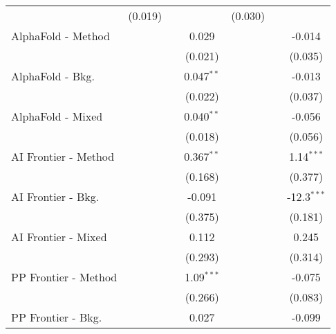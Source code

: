 \begin{tabular}{lcccccc}
                                  & (0.019)        &               &               & (0.030)        &              &   \\   
   AlphaFold - Method             &                &               & 0.029         &                &              & -0.014\\   
                                  &                &               & (0.021)       &                &              & (0.035)\\   
   AlphaFold - Bkg.               &                &               & 0.047$^{**}$  &                &              & -0.013\\   
                                  &                &               & (0.022)       &                &              & (0.037)\\   
   AlphaFold - Mixed              &                &               & 0.040$^{**}$  &                &              & -0.056\\   
                                  &                &               & (0.018)       &                &              & (0.056)\\   
   AI Frontier - Method           &                &               & 0.367$^{**}$  &                &              & 1.14$^{***}$\\   
                                  &                &               & (0.168)       &                &              & (0.377)\\   
   AI Frontier - Bkg.             &                &               & -0.091        &                &              & -12.3$^{***}$\\   
                                  &                &               & (0.375)       &                &              & (0.181)\\   
   AI Frontier - Mixed            &                &               & 0.112         &                &              & 0.245\\   
                                  &                &               & (0.293)       &                &              & (0.314)\\   
   PP Frontier - Method           &                &               & 1.09$^{***}$  &                &              & -0.075\\   
                                  &                &               & (0.266)       &                &              & (0.083)\\   
   PP Frontier - Bkg.             &                &               & 0.027         &                &              & -0.099\\   

\end{tabular}
